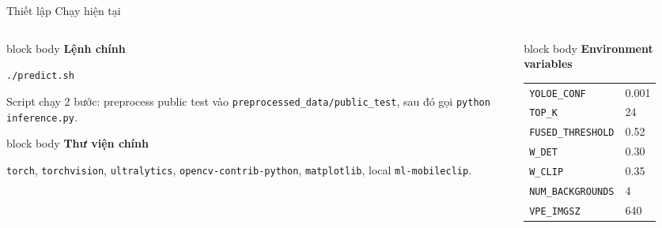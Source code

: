 \documentclass[aspectratio=169]{beamer}
\newenvironment{bluebox}[1]{
  \begin{beamercolorbox}[rounded=true,shadow=false,wd=\linewidth,sep=0.28cm]{block body}
  {\bfseries\color{DeepBlue}#1}\par\vspace{0.12cm}
}{
  \end{beamercolorbox}
}
\begin{document}
\begin{frame}{Thiết lập Chạy hiện tại}
  \small
  \begin{columns}[T,onlytextwidth]
    \begin{column}{0.50\textwidth}
      \begin{bluebox}{Lệnh chính}
        \scriptsize
        \texttt{./predict.sh}\par\vspace{0.15cm}
        Script chạy 2 bước: preprocess public test vào \texttt{preprocessed\_data/public\_test}, sau đó gọi \texttt{python inference.py}.
      \end{bluebox}
      \vspace{0.15cm}
      \begin{bluebox}{Thư viện chính}
        \scriptsize
        \texttt{torch}, \texttt{torchvision}, \texttt{ultralytics}, \texttt{opencv-contrib-python}, \texttt{matplotlib}, local \texttt{ml-mobileclip}.
      \end{bluebox}
    \end{column}
    \begin{column}{0.46\textwidth}
      \begin{bluebox}{Environment variables}
        \scriptsize
        \begin{tabular}{ll}
          \texttt{YOLOE\_CONF} & 0.001 \\
          \texttt{TOP\_K} & 24 \\
          \texttt{FUSED\_THRESHOLD} & 0.52 \\
          \texttt{W\_DET} & 0.30 \\
          \texttt{W\_CLIP} & 0.35 \\
          \texttt{NUM\_BACKGROUNDS} & 4 \\
          \texttt{VPE\_IMGSZ} & 640 \\
        \end{tabular}
      \end{bluebox}
    \end{column}
  \end{columns}
\end{frame}
\end{document}
